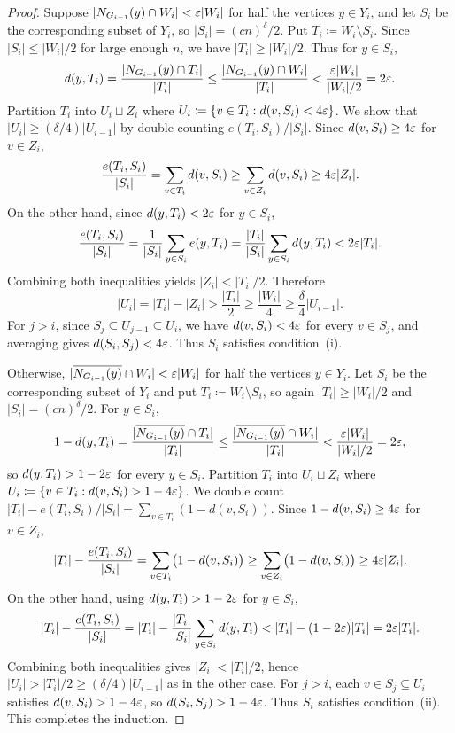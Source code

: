 \begin{proof}
  Suppose $|N_{G_{i - 1}}(y) \cap W_i| < \varepsilon|W_i|$ for half the vertices $y \in Y_i$, and let $S_i$ be the corresponding subset of $Y_i$, so $|S_i| = (cn)^{\delta}/2$. Put $T_i \coloneqq W_i \setminus S_i$. Since $|S_i| \leq |W_i|/2$ for large enough $n$, we have $|T_i| \geq |W_i|/2$. Thus for $y \in S_i$,
  \[
    d(y, T_i) = \frac{|N_{G_{i - 1}}(y) \cap T_i|}{|T_i|} \leq \frac{|N_{G_{i - 1}}(y) \cap W_i|}{|T_i|} < \frac{\varepsilon |W_i|}{|W_i|/2} = 2\varepsilon.
  \]
  Partition $T_i$ into $U_i \sqcup Z_i$ where $U_i \coloneqq \{v \in T_i : d(v, S_i) < 4 \varepsilon\}$. We show that $|U_i| \geq (\delta/4)|U_{i - 1}|$ by double counting $e(T_i, S_i)/|S_i|$. Since $d(v, S_i) \geq 4\varepsilon$ for $v \in Z_i$,
  \[
    \frac{e(T_i, S_i)}{|S_i|} = \sum_{v \in T_i} d(v, S_i) \geq \sum_{v \in Z_i} d(v, S_i) \geq 4\varepsilon|Z_i|.
  \]
  On the other hand, since $d(y, T_i) < 2\varepsilon$ for $y \in S_i$,
  \[
    \frac{e(T_i, S_i)}{|S_i|} = \frac{1}{|S_i|}\sum_{y \in S_i} e(y, T_i) = \frac{|T_i|}{|S_i|}\sum_{y \in S_i} d(y, T_i) < 2\varepsilon|T_i|.
  \]
  Combining both inequalities yields $|Z_i| < |T_i|/2$. Therefore
  \[
    |U_i| = |T_i| - |Z_i| > \frac{|T_i|}{2} \geq \frac{|W_i|}{4} \geq \frac{\delta}{4}|U_{i - 1}|.
  \]
  For $j > i$, since $S_j \subseteq U_{j - 1} \subseteq U_i$, we have $d(v, S_i) < 4\varepsilon$ for every $v \in S_j$, and averaging gives $d(S_i, S_j) < 4\varepsilon$. Thus $S_i$ satisfies condition~(i).

  Otherwise, $|\overline{N_{G_{i - 1}}(y)} \cap W_i| < \varepsilon|W_i|$ for half the vertices $y \in Y_i$. Let $S_i$ be the corresponding subset of $Y_i$ and put $T_i \coloneqq W_i \setminus S_i$, so again $|T_i| \geq |W_i|/2$ and $|S_i| = (cn)^{\delta}/2$. For $y \in S_i$,
  \[
    1 - d(y, T_i) = \frac{|\overline{N_{G_{i - 1}}(y)} \cap T_i|}{|T_i|} \leq \frac{|\overline{N_{G_{i - 1}}(y)} \cap W_i|}{|T_i|} < \frac{\varepsilon |W_i|}{|W_i|/2} = 2\varepsilon,
  \]
  so $d(y, T_i) > 1 - 2\varepsilon$ for every $y \in S_i$. Partition $T_i$ into $U_i \sqcup Z_i$ where $U_i \coloneqq \{v \in T_i : d(v, S_i) > 1 - 4\varepsilon\}$. We double count $|T_i| - e(T_i, S_i)/|S_i| = \sum_{v \in T_i}(1 - d(v, S_i))$. Since $1 - d(v, S_i) \geq 4\varepsilon$ for $v \in Z_i$,
  \[
    |T_i| - \frac{e(T_i, S_i)}{|S_i|} = \sum_{v \in T_i}\bigl(1 - d(v, S_i)\bigr) \geq \sum_{v \in Z_i}\bigl(1 - d(v, S_i)\bigr) \geq 4\varepsilon|Z_i|.
  \]
  On the other hand, using $d(y, T_i) > 1 - 2\varepsilon$ for $y \in S_i$,
  \[
    |T_i| - \frac{e(T_i, S_i)}{|S_i|} = |T_i| - \frac{|T_i|}{|S_i|}\sum_{y \in S_i} d(y, T_i) < |T_i| - (1 - 2\varepsilon)|T_i| = 2\varepsilon|T_i|.
  \]
  Combining both inequalities gives $|Z_i| < |T_i|/2$, hence $|U_i| > |T_i|/2 \geq (\delta/4)|U_{i - 1}|$ as in the other case. For $j > i$, each $v \in S_j \subseteq U_i$ satisfies $d(v, S_i) > 1 - 4\varepsilon$, so $d(S_i, S_j) > 1 - 4\varepsilon$. Thus $S_i$ satisfies condition~(ii). This completes the induction.
\end{proof}

